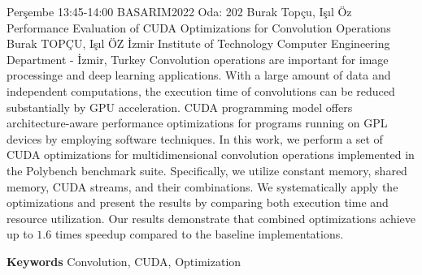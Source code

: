 
    \begin{abstract_basarim}
    {Perşembe 13:45-14:00}
    {BASARIM2022}
    {Oda: 202}
    {Burak Topçu, Işıl Öz}
    {Performance Evaluation of CUDA Optimizations for Convolution Operations}
    {%
    Burak TOPÇU, Işıl ÖZ}
    {%
    }
    {%
    İzmir Institute of Technology Computer Engineering Department - İzmir, Turkey}
    Convolution operations are important for image processinge and deep learning applications. With a large amount of data and independent computations, the execution time of convolutions can be reduced substantially by GPU acceleration. CUDA programming model offers architecture-aware performance optimizations for programs running on GPL devices by employing software techniques. In this work, we perform a set of CUDA optimizations for multidimensional convolution operations implemented in the Polybench benchmark suite. Specifically, we utilize constant memory, shared memory, CUDA streams, and their combinations. We systematically apply the optimizations and present the results by comparing both execution time and resource utilization. Our results demonstrate that combined optimizations achieve up to $1.6$ times speedup compared to the baseline implementations. 
    
        \textbf{Keywords} \newline{}Convolution, CUDA, Optimization
    \end{abstract_basarim}
    